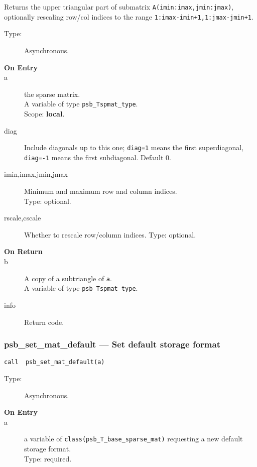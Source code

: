 Returns the upper triangular part of submatrix
\verb|A(imin:imax,jmin:jmax)|, optionally rescaling row/col indices to
the range \verb|1:imax-imin+1,1:jmax-jmin+1|.   
\begin{description}
\item[Type:] Asynchronous.
\item[\bf On Entry]
\item[a] the sparse matrix.\\
A variable of type \verb|psb_Tspmat_type|.\\
Scope: {\bf local}.\\
\item[diag] Include diagonals up to this one; \verb|diag=1| means the
  first superdiagonal, \verb|diag=-1| means the first subdiagonal. 
Default 0.
\item[imin,imax,jmin,jmax] Minimum and maximum row and column indices.\\
Type: optional.
\item[rscale,cscale] Whether to rescale row/column indices.
Type: optional.
\end{description}
\begin{description}
\item[\bf On Return]
\item[b] A copy  of a subtriangle of \verb|a|.\\
A variable of type \verb|psb_Tspmat_type|.
\item[info] Return code. 
\end{description}




\subsubsection*{psb\_set\_mat\_default --- Set default  storage format}


\begin{verbatim}
call  psb_set_mat_default(a)
\end{verbatim}

\begin{description}
\item[Type:] Asynchronous.
\item[\bf On Entry]
\item[a] a variable of \verb|class(psb_T_base_sparse_mat)|  requesting
  a new default storage format.\\ 
Type: required.
\end{description}





